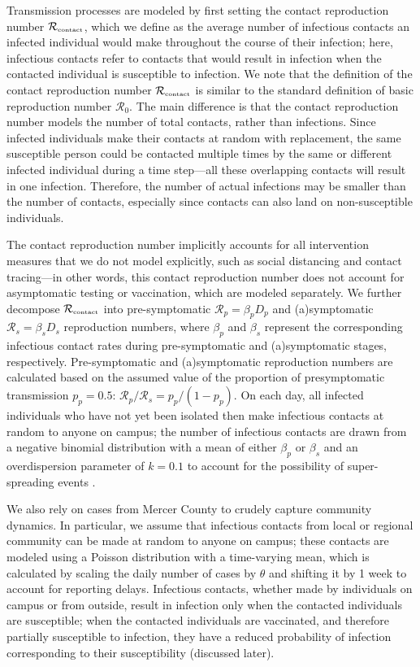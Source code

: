 \documentclass[12pt]{article}
\newcommand{\Rx}[1]{\ensuremath{{\mathcal R}_{#1}}}
\newcommand{\Rc}{\Rx{\textrm{\tiny{contact}}}}
\newcommand{\RR}{\ensuremath{{\mathcal R}}}
\begin{document}
Transmission processes are modeled by first setting the contact reproduction number $\Rc$, which we define as the average number of infectious contacts an infected individual would make throughout the course of their infection;
here, infectious contacts refer to contacts that would result in infection when the contacted individual is susceptible to infection.
We note that the definition of the contact reproduction number $\Rc$ is similar to the standard definition of basic reproduction number $\RR_0$.
The main difference is that the contact reproduction number models the number of total contacts, rather than infections. 
Since infected individuals make their contacts at random with replacement, the same susceptible person could be contacted multiple times by the same or different infected individual during a time step---all these overlapping contacts will result in one infection.
Therefore, the number of actual infections may be smaller than the number of contacts, especially since contacts can also land on non-susceptible individuals.

The contact reproduction number implicitly accounts for all intervention measures that we do not model explicitly, such as social distancing and contact tracing---in other words, this contact reproduction number does not account for asymptomatic testing or vaccination, which are modeled separately.
We further decompose $\Rc$ into pre-symptomatic $\mathcal R_p = \beta_p D_p$ and (a)symptomatic $\mathcal R_s = \beta_s D_s$ reproduction numbers, where $\beta_p$ and $\beta_s$ represent the corresponding infectious contact rates during pre-symptomatic and (a)symptomatic stages, respectively. Pre-symptomatic and (a)symptomatic reproduction numbers are calculated based on the assumed value of the proportion of presymptomatic transmission $p_p = 0.5$: $\mathcal R_p/\mathcal R_s = p_p/(1 - p_p)$.
On each day, all infected individuals who have not yet been isolated then make infectious contacts at random to anyone on campus; the number of infectious contacts are drawn from a negative binomial distribution with a mean of either $\beta_p$ or $\beta_s$ and an overdispersion parameter of $k=0.1$ to account for the possibility of super-spreading events \citep{10.12688/wellcomeopenres.15842.3}.

We also rely on cases from Mercer County to crudely capture community dynamics.
In particular, we assume that infectious contacts from local or regional community can be made at random to anyone on campus; these contacts are modeled using a Poisson distribution with a time-varying mean, which is calculated by scaling the daily number of cases by $\theta$ and shifting it by 1 week to account for reporting delays.
Infectious contacts, whether made by individuals on campus or from outside, result in infection only when the contacted individuals are susceptible; when the contacted individuals are vaccinated, and therefore partially susceptible to infection, they have a reduced probability of infection corresponding to their susceptibility (discussed later).
\end{document}
